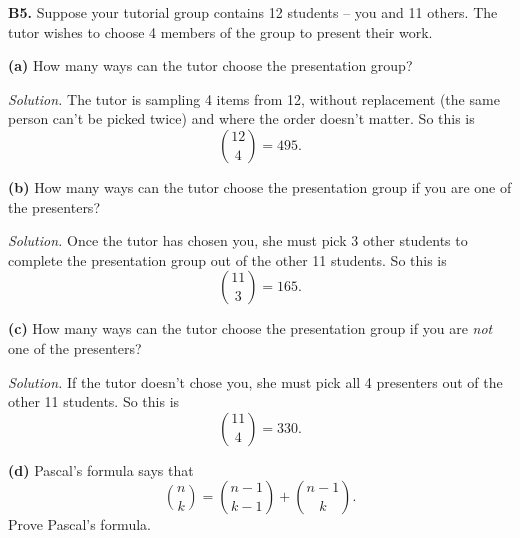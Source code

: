 \documentclass[
  a4paper,
]{book}
\theoremstyle{definition}
\theoremstyle{definition}
\theoremstyle{definition}
\theoremstyle{definition}
\theoremstyle{remark}
\begin{document}
\textbf{B5.} Suppose your tutorial group contains 12 students -- you and 11 others. The tutor wishes to choose 4 members of the group to present their work.

\textbf{(a)} How many ways can the tutor choose the presentation group?

\begin{myanswers}
\emph{Solution.}
The tutor is sampling 4 items from 12, without replacement (the same person can't be picked twice) and where the order doesn't matter. So this is
\[ \binom{12}{4} = 495 . \]

\end{myanswers}

\textbf{(b)} How many ways can the tutor choose the presentation group if you are one of the presenters?

\begin{myanswers}
\emph{Solution.}
Once the tutor has chosen you, she must pick 3 other students to complete the presentation group out of the other 11 students. So this is
\[ \binom{11}{3} = 165 . \]

\end{myanswers}

\textbf{(c)} How many ways can the tutor choose the presentation group if you are \emph{not} one of the presenters?

\begin{myanswers}
\emph{Solution.}
If the tutor doesn't chose you, she must pick all 4 presenters out of the other 11 students. So this is
\[ \binom{11}{4} = 330 . \]

\end{myanswers}

\textbf{(d)} Pascal's formula says that
\[ \binom{n}{k} = \binom{n-1}{k-1} + \binom{n-1}{k} . \]
Prove Pascal's formula.
\end{document}
